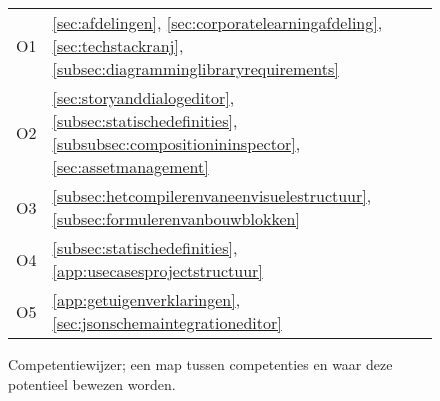 \begin{appendices}
\begin{figure}[htb]
\begin{tabular}{ | l | l | }
            O1 & \autoref{sec:afdelingen}, \autoref{sec:corporatelearningafdeling}, \autoref{sec:techstackranj}, \autoref{subsec:diagramminglibraryrequirements} \\
            O2 & \autoref{sec:storyanddialogeditor}, \autoref{subsec:statischedefinities}, \autoref{subsubsec:compositionininspector}, \autoref{sec:assetmanagement} \\
            O3 & \autoref{subsec:hetcompilerenvaneenvisuelestructuur}, \autoref{subsec:formulerenvanbouwblokken} \\
            O4 & \autoref{subsec:statischedefinities}, \autoref{app:usecasesprojectstructuur} \\
            O5 & \autoref{app:getuigenverklaringen}, \autoref{sec:jsonschemaintegrationeditor} \\
            \hline
        \end{tabular}
        \centering
        \caption{Competentiewijzer; een map tussen competenties en waar deze potentieel bewezen worden.}
    \end{figure}

    
    
\end{appendices}